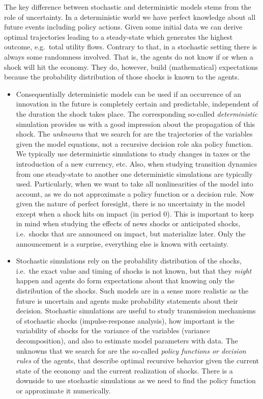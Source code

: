 The key difference between stochastic and deterministic models stems from the role of uncertainty.
In a deterministic world we have perfect knowledge about all future events including policy actions.
Given some initial data we can derive optimal trajectories
  leading to a steady-state which generates the highest outcome, e.g.\ total utility flows.
Contrary to that, in a stochastic setting there is always some randomness involved.
That is, the agents do not know if or when a shock will hit the economy.
They do, however, build (mathematical) expectations because the probability distribution of those shocks is known to the agents.

\begin{itemize}
\item     
Consequentially deterministic models can be used if an occurrence of an innovation in the future is completely certain and predictable,
  independent of the duration the shock takes place.
The corresponding so-called \emph{deterministic} simulation provides us with a good impression about the propagation of this shock.
The \emph{unknowns} that we search for are the trajectories of the variables given the model equations,
  not a recursive decision role aka policy function.
We typically use deterministic simulations to study changes in taxes
  or the introduction of a new currency, etc.
Also, when studying transition dynamics from one steady-state to another one deterministic simulations are typically used.
Particularly, when we want to take all nonlinearities of the model into account,
  as we do not approximate a policy function or a decision rule.
Now given the nature of perfect foresight,
  there is no uncertainty in the model except when a shock hits on impact (in period 0).
This is important to keep in mind when studying the effects of news shocks or anticipated shocks,
  i.e.\ shocks that are announced on impact, but materialize later.
Only the announcement is a surprise,
  everything else is known with certainty.

\item  
Stochastic simulations rely on the probability distribution of the shocks,
  i.e.\ the exact value and timing of shocks is not known,
  but that they \emph{might} happen and agents do form expectations about that knowing only the distribution of the shocks.
Such models are in a sense more realistic as the future is uncertain
  and agents make probability statements about their decision.
Stochastic simulations are useful to study transmission mechanisms of stochastic shocks (impulse-response analysis),
  how important is the variability of shocks for the variance of the variables (variance decomposition),
  and also to estimate model parameters with data.
The unknowns that we search for are the so-called \emph{policy functions or decision rules} of the agents,
  that describe optimal recursive behavior given the current state of the economy and the current realization of shocks.
There is a downside to use stochastic simulations
  as we need to find the policy function or approximate it numerically.

\end{itemize}